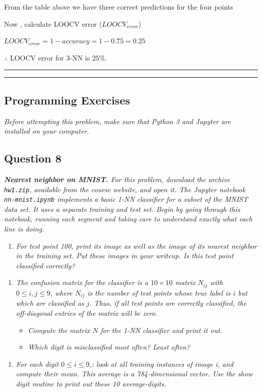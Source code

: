 \documentclass{article}
\begin{document}
From the table above we have three correct predictions for the four points

Now , calculate LOOCV error ($LOOCV_{error}$)

$LOOCV_{error} = 1 - accuracy = 1 - 0.75 = 0.25$

$\therefore$ LOOCV error for 3-NN is $25\%$.

\noindent\rule{\textwidth}{0.4pt}
\noindent\rule{\textwidth}{0.4pt}

\subsection*{Programming Exercises}

\textit{Before attempting this problem, make sure that Python 3 and Jupyter are installed on your computer.}
\subsection*{Question 8}

\textit{\textbf{Nearest neighbor on MNIST.} For this problem, download the archive \texttt{hw1.zip}, available from the course website, and open it. The Jupyter notebook \texttt{nn-mnist.ipynb} implements a basic 1-NN classifier for a subset of the MNIST data set. It uses a separate training and test set. Begin by going through this notebook, running each segment and taking care to understand exactly what each line is doing.}

\begin{enumerate}[label=(a)]
  \item \textit{For test point 100, print its image as well as the image of its nearest neighbor in the training set. Put these images in your writeup. Is this test point classified correctly?}
\end{enumerate}
\begin{enumerate}[label=(b)]
  \item \textit{The confusion matrix for the classifier is a $10 \times 10$ matrix $N_{ij}$ with $0 \leq i, j \leq 9$, where $N_{ij}$ is the number of test points whose true label is $i$ but which are classified as $j$. Thus, if all test points are correctly classified, the off-diagonal entries of the matrix will be zero.}
  \begin{itemize}
      \item \textit{Compute the matrix $N$ for the 1-NN classifier and print it out.}
      \item \textit{Which digit is misclassified most often? Least often?}
  \end{itemize}
\end{enumerate}
\begin{enumerate}[label=(c)]
  \item \textit{For each digit $0 \leq i \leq 9$,: look at all training instances of image i, and compute their mean. This average is a 784-dimensional vector. Use the show digit routine to print out these 10 average-digits.}\\
\end{enumerate}
\end{document}
